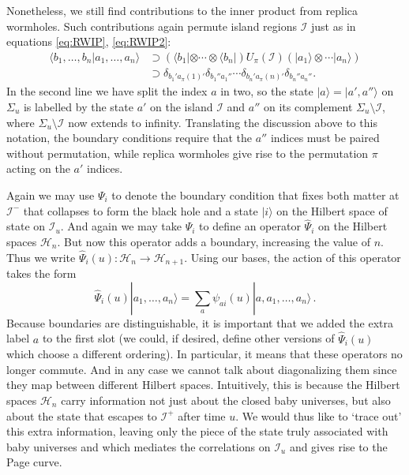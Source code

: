 \documentclass[letterpaper,12pt]{article}
\newcommand*{\hilb}{\mathcal{H}}	%
\newcommand*{\scri}{\mathscr{I}} %
\newcommand*{\island}{\mathcal{I}}
\begin{document}
Nonetheless, we still find contributions to the inner product from replica wormholes.  Such contributions again permute island regions $\island$ just as in  equations \eqref{eq:RWIP}, \eqref{eq:RWIP2}:
\begin{align}\label{eq:RWIP3}
	\langle b_1,\ldots,b_n|a_1,\ldots,a_n \rangle &\supset  (\langle b_1|\otimes \cdots \otimes \langle b_n|) U_\pi(\island) (|a_1\rangle\otimes \cdots |a_n \rangle) \\
	&\supset \delta_{b_1'a_\pi(1)'}\delta_{b_1''a_1''} \cdots \delta_{b_n'a_\pi(n)'}\delta_{b_n''a_n''}.
\end{align}
In the second line we have split the index $a$ in two, so the state $|a\rangle = |a',a''\rangle$ on $\Sigma_u$ is labelled by the state $a'$ on the island $\island$ and $a''$ on its complement $\Sigma_u\setminus \island$, where $\Sigma_u\setminus \island$ now extends to infinity. Translating the discussion above to this notation, the boundary conditions require that the $a''$ indices must be paired without permutation, while replica wormholes give rise to the permutation $\pi$ acting on the $a'$ indices.

Again we may use $\Psi_i$ to denote the boundary condition that fixes both matter at $\scri^-$ that collapses to form the black hole and  a  state $|i\rangle$ on the Hilbert space of state on $\scri_u$.  And again we may take $\Psi_i$ to define an operator $\hat{\Psi}_i$ on the Hilbert spaces $\hilb_n$.  But now this operator adds a boundary, increasing the value of $n$.  Thus we write $\hat{\Psi}_i(u): \hilb_n \to \hilb_{n+1}$.  Using our bases, the action of this operator takes the form
\begin{equation}\label{eq:Psiiu}
	\hat{\Psi}_i(u) |a_1,\ldots,a_n\rangle = \sum_a \psi_{ai}(u)|a,a_1,\ldots,a_n\rangle \,.
\end{equation}
Because boundaries are distinguishable, it is important that we added the extra label $a$ to the first slot (we could, if desired, define other versions of $\hat{\Psi}_i(u)$ which choose a different ordering). In particular, it means that these operators no longer commute.  And in any case we cannot talk about diagonalizing them since they map between different Hilbert spaces. Intuitively, this is because the Hilbert spaces $\hilb_n$ carry information not just about the closed baby universes, but also about the state that escapes to $\scri^+$ after time $u$. We would thus like to `trace out' this extra information, leaving only the piece of the state truly associated with baby universes and which mediates the correlations on $\scri_u$ and gives rise to the Page curve.
\end{document}
